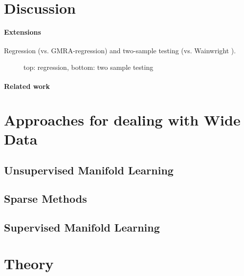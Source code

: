 \documentclass[10pt]{article}
\begin{document}
\clearpage
\section{Discussion}


\paragraph{Extensions}

Regression (vs. GMRA-regression) and two-sample testing (vs. Wainwright \cite{Lopes12a}).

\begin{figure*}[h!]
	\centering
	\caption{top: regression, bottom: two sample testing}
	\label{fig:regression}
\end{figure*}


\paragraph{Related work}

\cite{Duchene1988, Friedman1989, Aeberhard1994, Bensmail1996, Rodriguez2006, Bouveyron2007, Caruana2008, Scrucca2010, Ngo2012, Mai2012a, Mai2013, Kaban13a, Luo14a, Carson12a, Hamsici2006, Chen2012k}




\appendix
\clearpage


\section{Approaches for dealing with Wide Data}

\subsection{Unsupervised Manifold Learning}

\subsection{Sparse Methods}

\subsection{Supervised Manifold Learning}




\section{Theory}
\end{document}
